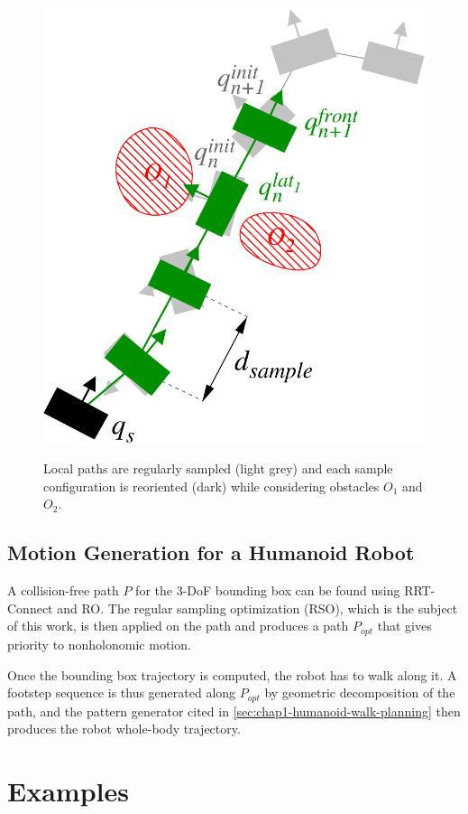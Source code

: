 \begin{figure}
  \centering
      {\includegraphics[width = 0.6\linewidth]
        {src/chap1-path-optimization/hash-direct-path.pdf}}
      \caption{Local paths are regularly sampled (light grey) and each
        sample configuration is reoriented (dark) while considering
        obstacles $O_1$ and $O_2$.}
      \label{fig:chap1-hash-direct-path}
\end{figure}

\subsection{Motion Generation for a Humanoid Robot}

A collision-free path $P$ for the 3-DoF bounding box can be found
using RRT-Connect and RO. The regular sampling optimization (RSO),
which is the subject of this work, is then applied on the path and
produces a path $P_{opt}$ that gives priority to nonholonomic motion.

Once the bounding box trajectory is computed, the robot has to walk
along it. A footstep sequence is thus generated along $P_{opt}$ by
geometric decomposition of the path, and the pattern generator cited
in \autoref{sec:chap1-humanoid-walk-planning} then produces the robot
whole-body trajectory.

\section{Examples}
\label{sec:chap1-examples}

